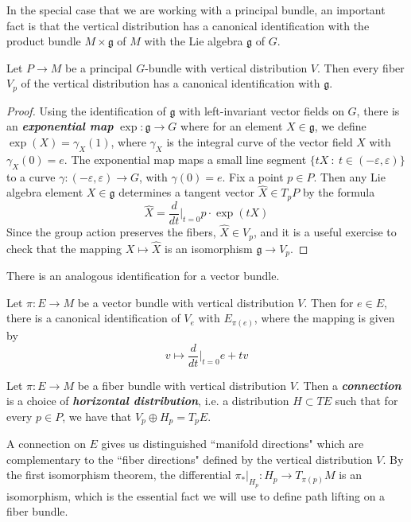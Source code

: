 \documentclass[abstract=on,twoside]{scrreprt}
\begin{document}
In the special case that we are working with a principal bundle, an important fact is
that the vertical distribution has a canonical identification with the product bundle
$M \times \mathfrak{g}$ of $M$ with the Lie algebra $\mathfrak{g}$ of $G$.
%
\begin{proposition}
Let $P \to M$ be a principal $G$-bundle with vertical distribution $V$. Then
every fiber $V_p$ of the vertical distribution has a canonical identification with
$\mathfrak{g}$.
\end{proposition}
%
\begin{proof}
Using the identification of $\mathfrak{g}$ with left-invariant vector fields on
$G$, there is an \textbf{\textit{exponential map}} $\exp : \mathfrak{g} \to G$
where for an element $X \in \mathfrak{g}$, we define $\exp(X) = \gamma_X(1)$, where
$\gamma_X$ is the integral curve of the vector field $X$ with $\gamma_X(0) = e$. The
exponential map maps a small line segment
$\{tX ~:~ t \in (-\varepsilon, \varepsilon)\}$ to a curve
$\gamma : (-\varepsilon,\varepsilon) \to G$, with $\gamma(0) = e$. Fix a point $p \in P$.
Then any Lie algebra element $X \in \mathfrak{g}$ determines a tangent vector
$\widehat{X} \in T_pP$ by the formula
\[
\widehat{X} = \frac{d}{dt}\bigg\vert_{t = 0}p \cdot \exp(tX)
\]
Since the group action preserves the fibers, $\widehat{X} \in V_p$, and it is a
useful exercise to check that the mapping $X \mapsto \widehat{X}$ is an isomorphism
$\mathfrak{g} \to V_p$.
\end{proof}
%
There is an analogous identification for a vector bundle.
%
\begin{proposition}
Let $\pi : E \to M$ be a vector bundle with vertical distribution $V$. Then for
$e \in E$, there is a canonical identification of $V_e$ with $E_{\pi(e)}$, where
the mapping is given by
\[
v \mapsto \frac{d}{dt}\bigg\vert_{t=0}e + tv
\]
\end{proposition}
%
\begin{definition}
Let $\pi : E \to M$ be a fiber bundle with vertical distribution $V$.
Then a \textbf{\textit{connection}} is a choice of
\textbf{\textit{horizontal distribution}}, i.e. a distribution $H \subset TE$ such that
for every $p \in P$, we have that $V_p \oplus H_p = T_pE$.
\end{definition}
%
A connection on $E$ gives us distinguished ``manifold directions" which are
complementary to the ``fiber directions" defined by the vertical distribution $V$.
By the first isomorphism theorem, the differential
$\pi_*\vert_{H_p} : H_p \to T_{\pi(p)}M$ is an isomorphism, which is the
essential fact we will use to define path lifting on a fiber bundle. \\
\end{document}
